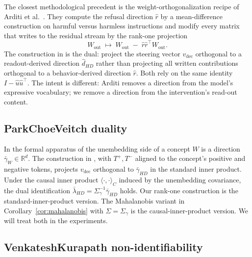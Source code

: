 \documentclass[11pt,letterpaper]{article}
\theoremstyle{plain}
\theoremstyle{definition}
\newcommand{\R}{\mathbb{R}}
\newcommand{\1}{\mathbf{1}}
\newcommand{\vdec}{v_{\text{dec}}}
\begin{document}
The closest methodological precedent is the weight-orthogonalization recipe of Arditi et al.\ \cite{arditi2024refusal}. They compute the refusal direction $\hat{r}$ by a mean-difference construction on harmful versus harmless instructions and modify every matrix that writes to the residual stream by the rank-one projection
\begin{equation}
W_{\text{out}} \;\mapsto\; W_{\text{out}} \;-\; \hat{r}\hat{r}^\top W_{\text{out}}.
\label{eq:arditi}
\end{equation}
The construction in  is the dual: project the steering vector $\vdec$ orthogonal to a readout-derived direction $\hat{d}_{HD}$ rather than projecting all written contributions orthogonal to a behavior-derived direction $\hat{r}$. Both rely on the same identity $I - \hat{u}\hat{u}^\top$. The intent is different: Arditi removes a direction from the model's expressive vocabulary; we remove a direction from the intervention's read-out content.

\subsection{Park\textendash Choe\textendash Veitch duality}

In the formal apparatus of \cite{park2024linear} the unembedding side of a concept $W$ is a direction $\bar{\gamma}_W \in \R^d$. The construction in , with $T^+, T^-$ aligned to the concept's positive and negative tokens, projects $\vdec$ orthogonal to $\bar{\gamma}_{HD}$ in the standard inner product. Under the causal inner product $\langle \cdot, \cdot\rangle_C$ induced by the unembedding covariance, the dual identification $\bar{\lambda}_{HD} = \Sigma_\gamma^{-1} \bar{\gamma}_{HD}$ holds. Our rank-one construction is the standard-inner-product version. The Mahalanobis variant in Corollary~\ref{cor:mahalanobis} with $\Sigma = \Sigma_\gamma$ is the causal-inner-product version. We will treat both in the experiments.

\subsection{Venkatesh\textendash Kurapath non-identifiability}
\end{document}
